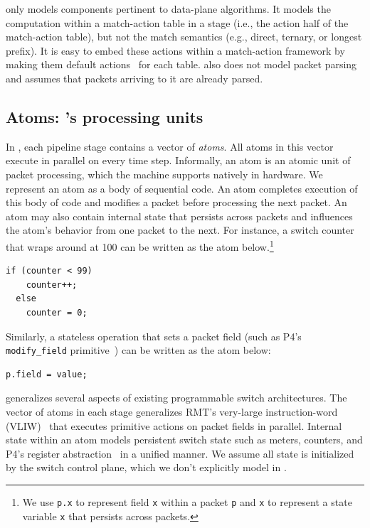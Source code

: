 \absmachine only models components pertinent to data-plane algorithms. It
models the computation within a match-action table in a stage (i.e., the action
half of the match-action table), but not the match semantics (e.g., direct,
ternary, or longest prefix). It is easy to embed these actions within a
match-action framework by making them default actions~\cite{p4spec} for each
table. \absmachine also does not model packet parsing and assumes that packets
arriving to it are already parsed.

\subsection{Atoms: \absmachine's processing units}

In \absmachine, each pipeline stage contains a vector of \textit{atoms}. All
atoms in this vector execute in parallel on every time step.  Informally, an
atom is an atomic unit of packet processing, which the \absmachine machine
supports natively in hardware. We represent an atom as a body of sequential
code. An atom completes execution of this body of code and modifies a packet
before processing the next packet.  An atom may also contain internal state
that persists across packets and influences the atom's behavior from one packet
to the next.  For instance, a switch counter that wraps around at 100 can be
written as the atom below.\footnote{We use {\tt p.x} to represent field {\tt x}
  within a packet {\tt p} and {\tt x} to represent a state variable {\tt x}
that persists across packets.}
  \begin{lstlisting}[style=customc, numbers=none, frame=none]
  if (counter < 99)
    counter++;
  else
    counter = 0;
  \end{lstlisting}
Similarly, a stateless operation that sets a packet field (such as P4's {\tt
modify\_field} primitive~\cite{p4spec}) can be written as the atom below:
\begin{lstlisting}[style=customc, numbers=none, frame=none]
  p.field = value;
\end{lstlisting}

\absmachine generalizes several aspects of existing programmable switch
architectures. The vector of atoms in each stage generalizes RMT's very-large
instruction-word (VLIW)~\cite{rmt} that executes primitive actions on packet
fields in parallel. Internal state within an atom models persistent switch
state such as meters, counters, and P4's register abstraction~\cite{p4spec} in
a unified manner. We assume all state is initialized by the switch control
plane, which we don't explicitly model in \absmachine.

